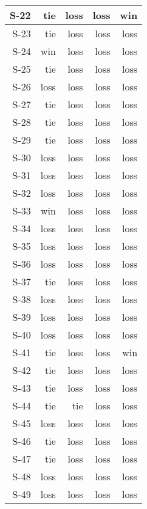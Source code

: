 \begin{tabular}{ | r | r | r | r | r | }
    \hline
         S-22  &    tie  &   loss  &   loss  &    win  \\
    \hline
         S-23  &    tie  &   loss  &   loss  &   loss  \\
    \hline
         S-24  &    win  &   loss  &   loss  &   loss  \\
    \hline
         S-25  &    tie  &   loss  &   loss  &   loss  \\
    \hline
         S-26  &   loss  &   loss  &   loss  &   loss  \\
    \hline
         S-27  &    tie  &   loss  &   loss  &   loss  \\
    \hline
         S-28  &    tie  &   loss  &   loss  &   loss  \\
    \hline
         S-29  &    tie  &   loss  &   loss  &   loss  \\
    \hline
         S-30  &   loss  &   loss  &   loss  &   loss  \\
    \hline
         S-31  &   loss  &   loss  &   loss  &   loss  \\
    \hline
         S-32  &   loss  &   loss  &   loss  &   loss  \\
    \hline
         S-33  &    win  &   loss  &   loss  &   loss  \\
    \hline
         S-34  &   loss  &   loss  &   loss  &   loss  \\
    \hline
         S-35  &   loss  &   loss  &   loss  &   loss  \\
    \hline
         S-36  &   loss  &   loss  &   loss  &   loss  \\
    \hline
         S-37  &    tie  &   loss  &   loss  &   loss  \\
    \hline
         S-38  &   loss  &   loss  &   loss  &   loss  \\
    \hline
         S-39  &   loss  &   loss  &   loss  &   loss  \\
    \hline
         S-40  &   loss  &   loss  &   loss  &   loss  \\
    \hline
         S-41  &    tie  &   loss  &   loss  &    win  \\
    \hline
         S-42  &    tie  &   loss  &   loss  &   loss  \\
    \hline
         S-43  &    tie  &   loss  &   loss  &   loss  \\
    \hline
         S-44  &    tie  &    tie  &   loss  &   loss  \\
    \hline
         S-45  &   loss  &   loss  &   loss  &   loss  \\
    \hline
         S-46  &    tie  &   loss  &   loss  &   loss  \\
    \hline
         S-47  &    tie  &   loss  &   loss  &   loss  \\
    \hline
         S-48  &   loss  &   loss  &   loss  &   loss  \\
    \hline
         S-49  &   loss  &   loss  &   loss  &   loss  \\
    \hline
\end{tabular}



